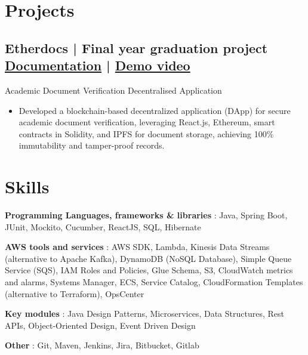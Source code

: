 \documentclass[a4,10pt]{article}
\newcommand{\subtext}[1]{
#1\par\vspace{-0.2cm}}
\newenvironment{zitemize}{
\begin{itemize}\itemsep0pt \parskip0pt \parsep1pt}
{\end{itemize}\vspace{-0.5cm}}
\newcommand{\hskills}[1]{
\textbf{\bfseries #1} }
\begin{document}
\vspace{-10pt}
\section*{Projects} 

\subsection*{Etherdocs | Final year graduation project \hfill {\href{https://github.com/DevelopersLeague/EtherDocs/blob/main/Readme.md}{Documentation}} | {\href{https://youtu.be/B_44aJ9hh6U?si=dGItpsQ3AEo_eIxk}{Demo video}}}
\subtext{{\normalsize\normalfont Academic Document Verification Decentralised Application}}
\begin{zitemize}
    \item Developed a blockchain-based decentralized application (DApp) for secure academic document verification, leveraging React.js, Ethereum, smart contracts in Solidity, and IPFS for document storage, achieving 100\% immutability and tamper-proof records.
\end{zitemize}


\section{Skills}

\hskills{Programming Languages, frameworks \& libraries}: Java, Spring Boot, JUnit, Mockito, Cucumber, ReactJS, SQL, Hibernate

\hskills{AWS tools and services}: AWS SDK, Lambda, Kinesis Data Streams (alternative to Apache Kafka), DynamoDB (NoSQL Database), Simple Queue Service (SQS), IAM Roles and Policies, Glue Schema, S3, CloudWatch metrics and alarms, Systems Manager, ECS, Service Catalog, CloudFormation Templates (alternative to Terraform), OpsCenter

\hskills{Key modules}: Java Design Patterns, Microservices, Data Structures, Rest APIs, Object-Oriented Design, Event Driven Design

\hskills{Other}: Git, Maven, Jenkins, Jira, Bitbucket, Gitlab     
\end{document}
